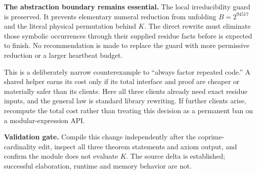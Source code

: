 \textbf{The abstraction boundary remains essential.} The local irreducibility guard is preserved. It prevents elementary numeral reduction from unfolding \(B=2^{94517}\) and the literal physical permutation behind \(K\). The direct rewrite must eliminate those symbolic occurrences through their supplied residue facts before  is expected to finish. No recommendation is made to replace the guard with more permissive reduction or a larger heartbeat budget.

This is a deliberately narrow counterexample to ``always factor repeated code.'' A shared helper earns its cost only if its total interface and proof are cheaper or materially safer than its clients. Here all three clients already need exact residue inputs, and the general law is standard library rewriting. If further clients arise, recompute the total cost rather than treating this decision as a permanent ban on a modular-expression API.

\textbf{Validation gate.} Compile this change independently after the coprime-cardinality edit, inspect all three theorem statements and axiom output, and confirm the module does not evaluate \(K\). The source delta is established; successful elaboration, runtime and memory behavior are not.
